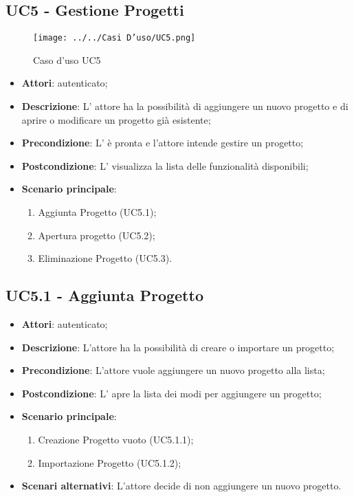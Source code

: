 \subsection{UC5 - Gestione Progetti}
\label{ssec:UC5}
\begin{figure}[h!]
\centering
\texttt{[image: ../../Casi D'uso/UC5.png]}
\caption{Caso d'uso UC5}
 \end{figure}
\begin{itemize}
\item \textbf{Attori}:  autenticato;
\item \textbf{Descrizione}: L’ attore ha la possibilità di aggiungere un nuovo progetto e di aprire o modificare un progetto già esistente;
\item \textbf{Precondizione}: L' è pronta e l'attore intende gestire un progetto;
\item \textbf{Postcondizione}: L’  visualizza la lista delle funzionalità disponibili;
\item \textbf{Scenario principale}: \begin{enumerate}\item Aggiunta Progetto (UC5.1);\item Apertura progetto (UC5.2);\item Eliminazione Progetto (UC5.3).
 \end{enumerate}
\end{itemize}
\newpage
\subsection{UC5.1 - Aggiunta Progetto}
\label{ssec:UC5.1}
\begin{itemize}
\item \textbf{Attori}:  autenticato;
\item \textbf{Descrizione}: L’attore ha la possibilità di creare o importare un progetto;
\item \textbf{Precondizione}: L’attore vuole aggiungere un nuovo progetto alla lista;
\item \textbf{Postcondizione}: L’ apre la lista dei modi per aggiungere un progetto;
\item \textbf{Scenario principale}: \begin{enumerate}\item Creazione Progetto vuoto (UC5.1.1);\item Importazione Progetto (UC5.1.2);
 \end{enumerate}
\item \textbf{Scenari alternativi}: L'attore decide di non aggiungere un nuovo progetto.
\end{itemize}
